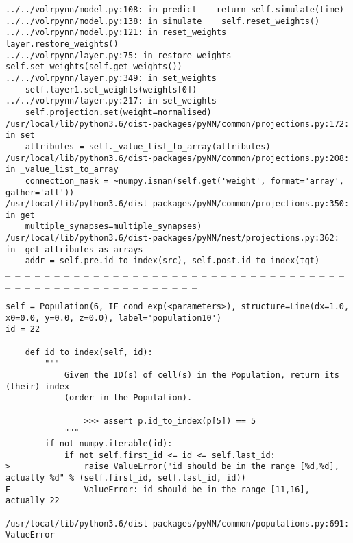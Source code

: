 \begin{lstlisting}[caption={PyNN exception when performing weight
initialisation during a test in \texttt{test\_merge.py}.},label={lst:pynn_exception}]
../../volrpynn/model.py:108: in predict    return self.simulate(time)                                                                                         
../../volrpynn/model.py:138: in simulate    self.reset_weights()
../../volrpynn/model.py:121: in reset_weights    layer.restore_weights()                                                                                            
../../volrpynn/layer.py:75: in restore_weights    self.set_weights(self.get_weights())
../../volrpynn/layer.py:349: in set_weights
    self.layer1.set_weights(weights[0])
../../volrpynn/layer.py:217: in set_weights
    self.projection.set(weight=normalised)
/usr/local/lib/python3.6/dist-packages/pyNN/common/projections.py:172: in set                                          
    attributes = self._value_list_to_array(attributes)
/usr/local/lib/python3.6/dist-packages/pyNN/common/projections.py:208: in _value_list_to_array                         
    connection_mask = ~numpy.isnan(self.get('weight', format='array', gather='all'))                                   
/usr/local/lib/python3.6/dist-packages/pyNN/common/projections.py:350: in get                                          
    multiple_synapses=multiple_synapses)
/usr/local/lib/python3.6/dist-packages/pyNN/nest/projections.py:362: in _get_attributes_as_arrays                      
    addr = self.pre.id_to_index(src), self.post.id_to_index(tgt)                                                       
_ _ _ _ _ _ _ _ _ _ _ _ _ _ _ _ _ _ _ _ _ _ _ _ _ _ _ _ _ _ _ _ _ _ _ _ _ _ _ _ _ _ _ _ _ _ _ _ _ _ _ _ _ _ _          

self = Population(6, IF_cond_exp(<parameters>), structure=Line(dx=1.0, x0=0.0, y=0.0, z=0.0), label='population10')    
id = 22

    def id_to_index(self, id):
        """
            Given the ID(s) of cell(s) in the Population, return its (their) index
            (order in the Population).
    
                >>> assert p.id_to_index(p[5]) == 5
            """
        if not numpy.iterable(id):
            if not self.first_id <= id <= self.last_id:
>               raise ValueError("id should be in the range [%d,%d], actually %d" % (self.first_id, self.last_id, id))
E               ValueError: id should be in the range [11,16], actually 22

/usr/local/lib/python3.6/dist-packages/pyNN/common/populations.py:691: ValueError
\end{lstlisting}
